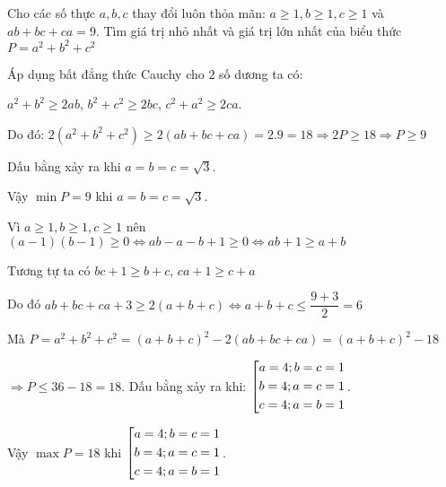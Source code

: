 \begin{ex}%
    Cho các số thực $a,b,c$ thay đổi luôn thỏa mãn: $a\ge 1, b\ge 1, c\ge 1$ và $ab+bc+ca=9$. Tìm giá trị nhỏ nhất và giá trị lớn nhất của biểu thức $P=a^2+b^2+c^2$
\loigiai
    {
    	Áp dụng bất đẳng thức Cauchy cho $2$ số dương ta có:
    	
    	$a^2+b^2\ge 2ab$, $b^2+c^2\ge 2bc$, $c^2+a^2\ge 2ca$.
    	
    	Do đó: $2(a^2+b^2+c^2)\ge 2(ab+bc+ca)=2.9=18 \Rightarrow 2P \ge 18 \Rightarrow P\ge 9$ 
    	
    	Dấu bằng xảy ra khi $a=b=c=\sqrt{3}.$
    	
    	 Vậy $\min P=9$ khi $a=b=c=\sqrt{3}$.
    	
    	Vì $a\ge 1, b\ge 1, c\ge 1$ nên $(a-1)(b-1)\ge 0 \Leftrightarrow ab-a-b+1\ge 0 \Leftrightarrow ab+1\ge a+b $
    	
    	Tương tự ta có $bc+1\ge b+c$, $ca+1\ge c+a $
    	
    	Do đó $ab+bc+ca+3\ge 2(a+b+c) \Leftrightarrow a+b+c\le \dfrac{9+3}{2}=6$
    	
    	Mà $P=a^2+b^2+c^2=(a+b+c)^2-2(ab+bc+ca)=(a+b+c)^2-18$
    	
    	$\Rightarrow P \le 36-18=18$. Dấu bằng xảy ra khi: $\left[\begin{aligned}a=4; b=c=1\\b=4; a=c=1\\c=4;a=b=1\end{aligned}\right.$.
    	
    	Vậy $\max P=18$ khi $\left[\begin{aligned}a=4; b=c=1\\b=4; a=c=1\\c=4;a=b=1\end{aligned}\right.$.
    }
\end{ex}
